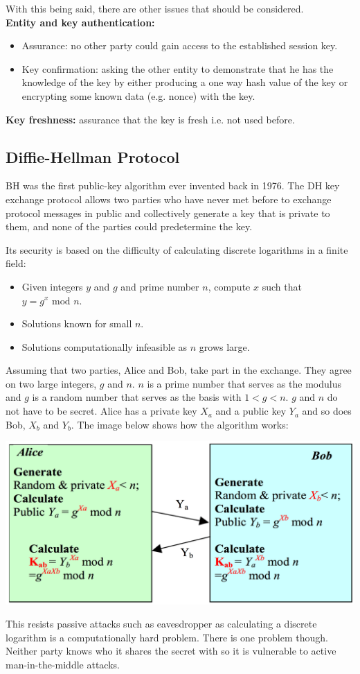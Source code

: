 \documentclass{article}
\newcommand{\Mod}[1]{\text{ mod }#1}
\begin{document}
With this being said, there are other issues that should be considered. \\
\textbf{Entity and key authentication:}
\begin{itemize}
  \item Assurance: no other party could gain access to the established session key.
  \item Key confirmation: asking the other entity to demonstrate that he has the knowledge of the key by either producing a one way hash value of the key or encrypting some known data (e.g. nonce) with the key.
\end{itemize}
\textbf{Key freshness:} assurance that the key is fresh i.e. not used before.

\subsection{Diffie-Hellman Protocol}
BH was the first public-key algorithm ever invented back in 1976. The DH key exchange protocol allows two parties who have never met before to exchange protocol messages in public and collectively generate a key that is private to them, and none of the parties could predetermine the key.

Its security is based on the difficulty of calculating discrete logarithms in a finite field:
\begin{itemize}
  \item Given integers $y$ and $g$ and prime number $n$, compute $x$ such that $y = g^{x} \Mod n$.
  \item Solutions known for small $n$.
  \item Solutions computationally infeasible as $n$ grows large.
\end{itemize}
Assuming that two parties, Alice and Bob, take part in the exchange. They agree on two large integers, $g$ and $n$. $n$ is a prime number that serves as the modulus and $g$ is a random number that serves as the basis with $1 < g < n$. $g$ and $n$ do not have to be secret. Alice has a private key $X_{a}$ and a public key $Y_{a}$ and so does Bob, $X_{b}$ and $Y_{b}$. The image below shows how the algorithm works:
\begin{center}
  \includegraphics[scale=0.3]{dh.png}
\end{center}
This resists passive attacks such as eavesdropper as calculating a discrete logarithm is a computationally hard problem. There is one problem though. Neither party knows who it shares the secret with so it is vulnerable to active man-in-the-middle attacks.
\end{document}
